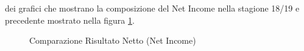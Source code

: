 \documentclass[
    corpo=12pt,
    oneside,
    evenboxes,
    tipotesi=triennale,
    stile=classica,
    oldstyle,
    autoretitolo,
    greek,
]{toptesi}
\begin{document}
\begin{interlinea}{1.5}
dei grafici che mostrano la composizione del Net Income nella stagione 18/19 e precedente mostrato nella figura \ref{comp_income}.
\begin{figure}
    \centering
     \quad
    \caption{Comparazione Risultato Netto (Net Income)}
    \label{comp_income}  
\end{figure}


\end{interlinea}
\end{document}
